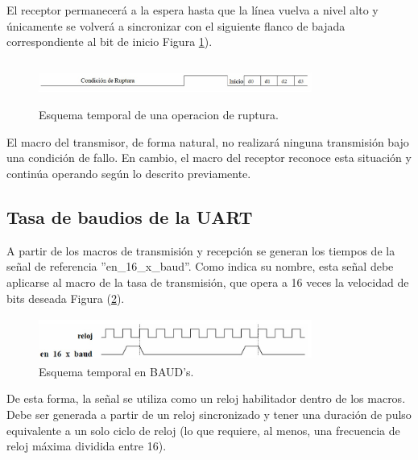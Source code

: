 El receptor permanecerá a la espera hasta que la línea vuelva a nivel alto y únicamente se volverá a sincronizar con el siguiente flanco de bajada correspondiente al bit de inicio Figura \ref{fig:imagen11}).

\begin{figure}[h!] %
    \centering %
     \includegraphics[width=0.8\textwidth, height=1.4cm]{imagenes/img11} %
    \caption{  Esquema temporal de una operacion de ruptura.}
    \label{fig:imagen11} %
\end{figure} 

El macro del transmisor, de forma natural, no realizará ninguna transmisión bajo una condición de fallo. En cambio, el macro del receptor reconoce esta situación y continúa operando según lo descrito previamente.

\subsection{Tasa de baudios de la UART}

A partir de los macros de transmisión y recepción se generan los tiempos de la señal de referencia ''en\_16\_x\_baud''. Como indica su nombre, esta señal debe aplicarse al macro de la tasa de transmisión, que opera a 16 veces la velocidad de bits deseada Figura (\ref{fig:imagen12}).

\begin{figure}[h!] %
    \centering %
     \includegraphics[width=0.8\textwidth, height=1.4cm]{imagenes/img12} %
    \caption{  Esquema temporal en BAUD's.}
    \label{fig:imagen12} %
\end{figure} 

De esta forma, la señal se utiliza como un reloj habilitador dentro de los macros. Debe ser generada a partir de un reloj sincronizado y tener una duración de pulso equivalente a un solo ciclo de reloj (lo que requiere, al menos, una frecuencia de reloj máxima dividida entre 16).

